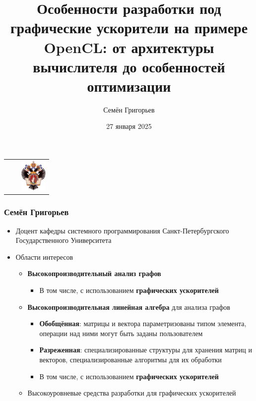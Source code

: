 \documentclass[xcolor=table,aspectratio=169]{beamer}
\title[GPGPU + OpenCL]{Особенности разработки под графические ускорители на примере OpenCL: от архитектуры вычислителя до особенностей оптимизации}
\institute[СПбГУ]{Снакт-Петербургский Государственный Университет
}
\author[Семён Григорьев]{Семён Григорьев}
\date{27 января 2025}
\begin{document}
{
\begin{frame}[fragile]
  \begin{table}
  \centering
  \begin{tabularx}{\linewidth}{XcX}
    \hfill
    & 
    & \hfill \includegraphics[height=1.6cm]{pictures/SPbGU_Logo.png}
  \end{tabularx}
  \end{table}
  \titlepage
\end{frame}
}

\begin{frame}[fragile]
  \frametitle{Семён Григорьев}
  \begin{minipage}{0.70\textwidth}
  \begin{itemize}    
    \item Доцент кафедры системного программирования Санкт-Петербургского Государственного Университета
    \item Области интересов
    \begin{itemize}    
      \item \textbf{Высокопроизводительный анализ графов}
      \begin{itemize}    
        \item В том числе, с использованием \textbf{графических ускорителей}
      \end{itemize}
      \item \textbf{Высокопроизводительная линейная алгебра} для анализа графов
      \begin{itemize}    
        \item \textbf{Обобщённая}: матрицы и вектора параметризованы типом элемента, операции над ними могут быть заданы пользователем
        \item \textbf{Разреженная}: специализированные структуры для хранения матриц и векторов, специализированные алгоритмы для их обработки 
        \item В том числе, с использованием \textbf{графических ускорителей}
      \end{itemize}
      \item Высокоуровневые средства разработки для графических ускорителей      
    \end{itemize}
    \end{itemize}

\end{minipage}
\end{frame}
\end{document}
